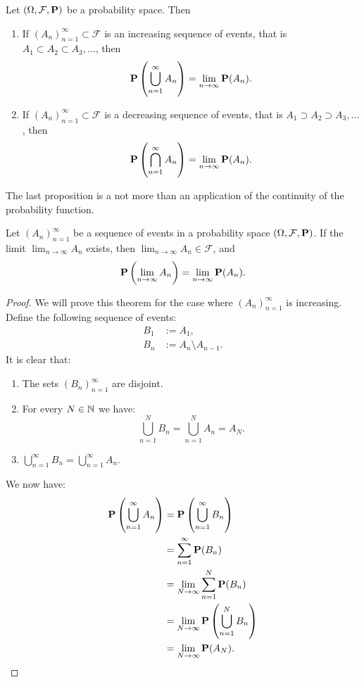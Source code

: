 \documentclass[11pt,a4paper]{article}
\begin{document}
\begin{proposition}
  \label{thm:continuity-base}
  Let $(\Omega, \mathcal F, \mathbf{P})$ be a probability space.
  Then
  \begin{enumerate}
    \item[(1)] If $(A_n)_{n=1}^{\infty} \subset \mathcal F$ is an increasing
      sequence of events, that is $A_1 \subset A_2 \subset A_3, \dots$,
      then
      \[
        \mathbf{P}\left(\bigcup_{n=1}^{\infty}{A_n}\right) = 
        \lim_{n \to \infty} \mathbf{P}(A_n).
      \]
    \item[(2)] If $(A_n)_{n=1}^{\infty} \subset \mathcal F$ is a decreasing
      sequence of events, that is $A_1 \supset A_2 \supset A_3, \dots$,
      then
      \[
        \mathbf{P}\left(\bigcap_{n=1}^{\infty}{A_n}\right) = 
        \lim_{n \to \infty} \mathbf{P}(A_n).
      \]
  \end{enumerate}
\end{proposition}

\begin{remark}
  The last proposition is a not more than an application of the
  continuity of the probability function.
\end{remark}

\begin{proposition}
  Let $(A_n)_{n=1}^{\infty}$ be a sequence of events in a probability space
  $(\Omega, \mathcal F, \mathbf{P})$. If the limit $\lim_{n \to \infty} A_n$
  exists, then $\lim_{n \to \infty} A_n \in \mathcal F$, and
  \[
    \Prob\del{\lim_{n \to \infty}{A_n}} = 
    \lim_{n \to \infty} \Prob(A_n).
  \]
\end{proposition}
\begin{proof}
  We will prove this theorem for the case 
  where $(A_n)_{n=1}^{\infty}$ is increasing.
  Define the following sequence of events:
  \begin{align*}
    B_1 &:= A_1, \\
    B_n &:= A_n \setminus A_{n-1}.
  \end{align*}
  It is clear that:
  \begin{enumerate}
    \item[(1)] The sets $(B_n)_{n=1}^{\infty}$ are disjoint.
    \item[(2)] For every $N \in \mathbb{N}$ we have: 
      \[ \bigcup_{n=1}^{N} B_n = \bigcup_{n=1}^{N} A_n = A_N. \]
    \item[(3)] $\bigcup_{n=1}^{\infty} B_n = \bigcup_{n=1}^{\infty} A_n$.
  \end{enumerate}
  We now have:
  \begin{align*}
    \mathbf{P} \left(\bigcup_{n=1}^{\infty} A_n\right) &=
    \mathbf{P} \left(\bigcup_{n=1}^{\infty} B_n\right) \\ &=
    \sum_{n=1}^{\infty} \mathbf{P} (B_n) \\ &=
    \lim_{N \to \infty} \sum_{n=1}^{N} \mathbf{P}(B_n) \\ &=
    \lim_{N \to \infty} \mathbf{P}\left(\bigcup_{n=1}^{N} B_n\right) \\ &=
    \lim_{N \to \infty} \mathbf{P}(A_N).
  \end{align*}
\end{proof}
\end{document}
